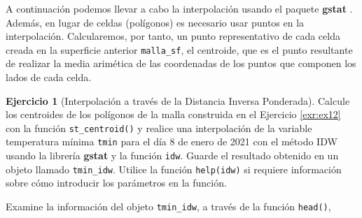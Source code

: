 \documentclass[
]{report}
\theoremstyle{definition}
\theoremstyle{definition}
\theoremstyle{definition}
\newtheorem{exercise}{Ejercicio}[chapter]
\theoremstyle{definition}
\theoremstyle{remark}
\begin{document}
A continuación podemos llevar a cabo la interpolación usando el paquete
\textbf{gstat} \citep{R-gstat}. Además, en lugar de celdas (polígonos) es necesario usar
puntos en la interpolación. Calcularemos, por tanto, un punto representativo de
cada celda creada en la superficie anterior \texttt{malla\_sf}, el centroide, que es el
punto resultante de realizar la media arimética de las coordenadas de los puntos
que componen los lados de cada celda.

\begin{exercise}[Interpolación a través de la Distancia Inversa Ponderada]
\protect\hypertarget{exr:ex13}{}\label{exr:ex13}Calcule los centroides de los polígonos de la malla construida en el Ejercicio
\ref{exr:ex12} con la función \texttt{st\_centroid()} y realice una interpolación de la
variable temperatura mínima \texttt{tmin} para el día 8 de enero de 2021 con el método
IDW usando la librería \textbf{gstat} y la función \texttt{idw}. Guarde el resultado
obtenido en un objeto llamado \texttt{tmin\_idw}. Utilice la función \texttt{help(idw)} si
requiere información sobre cómo introducir los parámetros en la función.

Examine la información del objeto \texttt{tmin\_idw}, a través de la función \texttt{head()},
\end{exercise}
\end{document}
